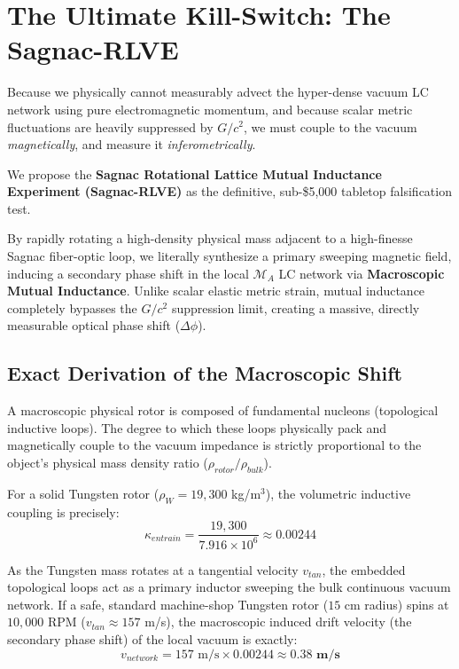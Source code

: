 \section{The Ultimate Kill-Switch: The Sagnac-RLVE}

Because we physically cannot measurably advect the hyper-dense vacuum LC network using pure electromagnetic momentum, and because scalar metric fluctuations are heavily suppressed by $G/c^2$, we must couple to the vacuum \textit{magnetically}, and measure it \textit{inferometrically}. 

We propose the \textbf{Sagnac Rotational Lattice Mutual Inductance Experiment (Sagnac-RLVE)} as the definitive, sub-\$5,000 tabletop falsification test.

By rapidly rotating a high-density physical mass adjacent to a high-finesse Sagnac fiber-optic loop, we literally synthesize a primary sweeping magnetic field, inducing a secondary phase shift in the local $\mathcal{M}_A$ LC network via \textbf{Macroscopic Mutual Inductance}. Unlike scalar elastic metric strain, mutual inductance completely bypasses the $G/c^2$ suppression limit, creating a massive, directly measurable optical phase shift ($\Delta \phi$). 

\subsection{Exact Derivation of the Macroscopic Shift}
A macroscopic physical rotor is composed of fundamental nucleons (topological inductive loops). The degree to which these loops physically pack and magnetically couple to the vacuum impedance is strictly proportional to the object's physical mass density ratio ($\rho_{rotor} / \rho_{bulk}$). 

For a solid Tungsten rotor ($\rho_W = 19,300$ kg/m$^3$), the volumetric inductive coupling is precisely:
\begin{equation}
    \kappa_{entrain} = \frac{19,300}{7.916 \times 10^6} \approx \mathbf{0.00244}
\end{equation}

As the Tungsten mass rotates at a tangential velocity $v_{tan}$, the embedded topological loops act as a primary inductor sweeping the bulk continuous vacuum network. If a safe, standard machine-shop Tungsten rotor ($15$ cm radius) spins at $10,000$ RPM ($v_{tan} \approx 157$ m/s), the macroscopic induced drift velocity (the secondary phase shift) of the local vacuum is exactly:
\begin{equation}
    v_{network} = 157 \text{ m/s} \times 0.00244 \approx \mathbf{0.38 \text{ m/s}}
\end{equation}

